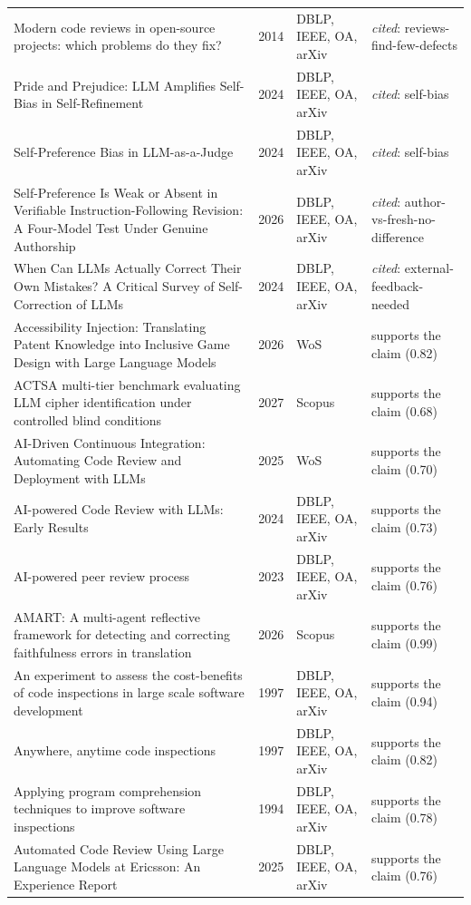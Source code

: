 \begin{longtable}{@{}%
  >{\raggedright\arraybackslash}p{}c%
  >{\raggedright\arraybackslash}p{}%
  >{\raggedright\arraybackslash}p{}@{}}
Modern code reviews in open-source projects: which problems do they fix? & 2014 & DBLP, IEEE, OA, arXiv & \emph{cited}: reviews-find-few-defects \\
Pride and Prejudice: LLM Amplifies Self-Bias in Self-Refinement & 2024 & DBLP, IEEE, OA, arXiv & \emph{cited}: self-bias \\
Self-Preference Bias in LLM-as-a-Judge & 2024 & DBLP, IEEE, OA, arXiv & \emph{cited}: self-bias \\
Self-Preference Is Weak or Absent in Verifiable Instruction-Following Revision: A Four-Model Test Under Genuine Authorship & 2026 & DBLP, IEEE, OA, arXiv & \emph{cited}: author-vs-fresh-no-difference \\
When Can LLMs Actually Correct Their Own Mistakes? A Critical Survey of Self-Correction of LLMs & 2024 & DBLP, IEEE, OA, arXiv & \emph{cited}: external-feedback-needed \\
Accessibility Injection: Translating Patent Knowledge into Inclusive Game Design with Large Language Models & 2026 & WoS & supports the claim (0.82) \\
ACTSA multi-tier benchmark evaluating LLM cipher identification under controlled blind conditions & 2027 & Scopus & supports the claim (0.68) \\
AI-Driven Continuous Integration: Automating Code Review and Deployment with LLMs & 2025 & WoS & supports the claim (0.70) \\
AI-powered Code Review with LLMs: Early Results & 2024 & DBLP, IEEE, OA, arXiv & supports the claim (0.73) \\
AI-powered peer review process & 2023 & DBLP, IEEE, OA, arXiv & supports the claim (0.76) \\
AMART: A multi-agent reflective framework for detecting and correcting faithfulness errors in translation & 2026 & Scopus & supports the claim (0.99) \\
An experiment to assess the cost-benefits of code inspections in large scale software development & 1997 & DBLP, IEEE, OA, arXiv & supports the claim (0.94) \\
Anywhere, anytime code inspections & 1997 & DBLP, IEEE, OA, arXiv & supports the claim (0.82) \\
Applying program comprehension techniques to improve software inspections & 1994 & DBLP, IEEE, OA, arXiv & supports the claim (0.78) \\
Automated Code Review Using Large Language Models at Ericsson: An Experience Report & 2025 & DBLP, IEEE, OA, arXiv & supports the claim (0.76) \\

\end{longtable}
